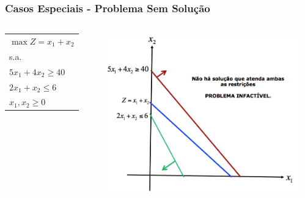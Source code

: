 \documentclass{beamer}
\begin{document}
\begin{frame}
	\frametitle{Casos Especiais - Problema Sem Solução}
	\centering
	\begin{columns}
		\begin{column}{0.3\textwidth}
			\begin{mdframed}[backgroundcolor=blue!20] 
				\scriptsize
				\begin{tabular}{l}
				$\max Z = x_1 + x_2$ \\
				s.a. \\
				$5x_1+4x_2 \ge 40$ \\
				$2x_1+x_2 \le 6$ \\
				$x_1, x_2 \ge 0 $  \\
				\end{tabular}
			\end{mdframed}
		\end{column}
		\begin{column}{0.7\textwidth}
			\includegraphics[width=8.5cm,height=7cm]{CasosEspeciais-Infactivel.png}
		\end{column}
	\end{columns}
\end{frame}
\end{document}
